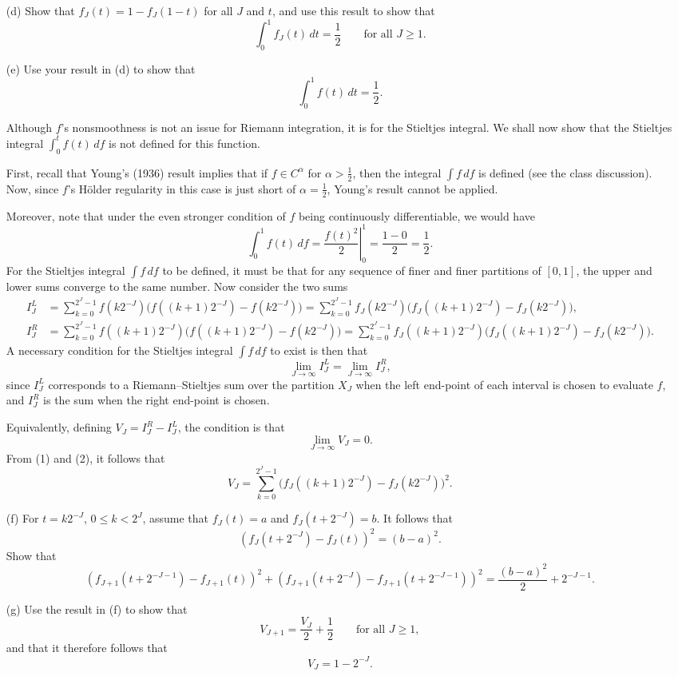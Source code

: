\documentclass{article}
\begin{document}
\begin{enumerate}
\item[(d)] Show that $f_J(t)=1-f_J(1-t)$ for all $J$ and $t$, and use this result to show that
\[
\int_0^1 f_J(t)\,dt=\frac12
\qquad \text{for all } J\ge 1.
\]

\item[(e)] Use your result in (d) to show that
\[
\int_0^1 f(t)\,dt=\frac12.
\]

\medskip
Although $f$'s nonsmoothness is not an issue for Riemann integration, it is for the Stieltjes integral. We shall now show that the Stieltjes integral $\int_0^t f(t)\,df$ is not defined for this function.

First, recall that Young's (1936) result implies that if $f\in C^\alpha$ for $\alpha>\frac12$, then the integral $\int f\,df$ is defined (see the class discussion).
Now, since $f$'s H\"older regularity in this case is just short of $\alpha=\frac12$, Young's result cannot be applied.

Moreover, note that under the even stronger condition of $f$ being continuously differentiable, we would have
\[
\int_0^1 f(t)\,df = \left.\frac{f(t)^2}{2}\right|_{0}^{1}=\frac{1-0}{2}=\frac12.
\]
For the Stieltjes integral $\int f\,df$ to be defined, it must be that for any sequence of finer and finer partitions of $[0,1]$, the upper and lower sums converge to the same number. Now consider the two sums
\begin{align}
I_J^L
&=
\sum_{k=0}^{2^J-1}
f(k2^{-J})\bigl(f((k+1)2^{-J})-f(k2^{-J})\bigr)
=
\sum_{k=0}^{2^J-1}
f_J(k2^{-J})\bigl(f_J((k+1)2^{-J})-f_J(k2^{-J})\bigr),
\tag{1}\\
I_J^R
&=
\sum_{k=0}^{2^J-1}
f((k+1)2^{-J})\bigl(f((k+1)2^{-J})-f(k2^{-J})\bigr)
=
\sum_{k=0}^{2^J-1}
f_J((k+1)2^{-J})\bigl(f_J((k+1)2^{-J})-f_J(k2^{-J})\bigr).
\tag{2}
\end{align}
A necessary condition for the Stieltjes integral $\int f\,df$ to exist is then that
\[
\lim_{J\to\infty} I_J^L = \lim_{J\to\infty} I_J^R,
\]
since $I_J^L$ corresponds to a Riemann--Stieltjes sum over the partition $X_J$ when the left end-point of each interval is chosen to evaluate $f$, and $I_J^R$ is the sum when the right end-point is chosen.

Equivalently, defining $V_J=I_J^R-I_J^L$, the condition is that
\[
\lim_{J\to\infty} V_J=0.
\]
From (1) and (2), it follows that
\[
V_J=\sum_{k=0}^{2^J-1}\bigl(f_J((k+1)2^{-J})-f_J(k2^{-J})\bigr)^2.
\]

\item[(f)] For $t=k2^{-J}$, $0\le k<2^J$, assume that $f_J(t)=a$ and $f_J(t+2^{-J})=b$. It follows that
\[
(f_J(t+2^{-J})-f_J(t))^2=(b-a)^2.
\]
Show that
\[
\left(f_{J+1}(t+2^{-J-1})-f_{J+1}(t)\right)^2
+
\left(f_{J+1}(t+2^{-J})-f_{J+1}(t+2^{-J-1})\right)^2
=
\frac{(b-a)^2}{2}+2^{-J-1}.
\tag{3}
\]

\item[(g)] Use the result in (f) to show that
\[
V_{J+1}=\frac{V_J}{2}+\frac12
\qquad \text{for all } J\ge 1,
\]
and that it therefore follows that
\[
V_J=1-2^{-J}.
\]
\end{enumerate}
\end{document}
